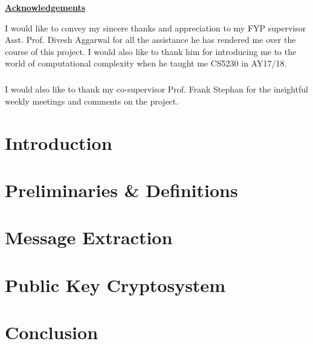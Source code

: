 \documentclass[12pt]{report}
\theoremstyle{definition}
\begin{document}
\newpage
\begin{center}
    \underline{\textbf{Acknowledgements}}
\end{center}
I would like to convey my sincere thanks and appreciation to my FYP supervisor Asst. Prof. Divesh Aggarwal for all the assistance he has rendered me over the course of this project. I would also like to thank him for introducing me to the world of computational complexity when he taught me CS5230 in AY17/18.

\paragraph{}
I would also like to thank my co-supervisor Prof. Frank Stephan for the insightful weekly meetings and comments on the project.
\newpage

\tableofcontents


\chapter{Introduction}


\chapter{Preliminaries \& Definitions}


\chapter{Message Extraction}\label{correctness_chapter}


\chapter{Public Key Cryptosystem}\label{description_chapter}


\chapter{Conclusion}





\end{document}
